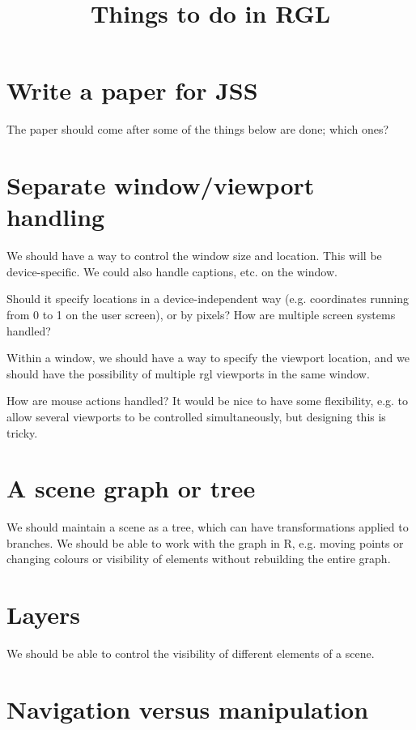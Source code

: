 \documentclass[12pt]{article}
\title{Things to do in RGL}
\begin{document}
\maketitle
\section{Write a paper for JSS}

The paper should come after some of the things below are done; which ones?

\section{Separate window/viewport handling}

We should have a way to control the window size and location.  This will be device-specific. 
We could also handle captions, etc. on the window.

Should it specify locations in a device-independent way (e.g. coordinates running from 0 to 1 on the user screen),
or by pixels?  How are multiple screen systems handled?

Within a window, we should have a way to specify the viewport location, and we should have the
possibility of multiple rgl viewports in the same window.

How are mouse actions handled?  It would be nice to have some flexibility, e.g.
to allow several viewports to be controlled simultaneously, but designing this is tricky. 

\section{A scene graph or tree}

We should maintain a scene as a tree, which can have transformations applied to branches. We should
be able to work with the graph in R, e.g. moving points or changing colours or visibility
of elements without rebuilding the entire graph.

\section{Layers}

We should be able to control the visibility of different elements of a scene.

\section{Navigation versus manipulation}
\end{document}

